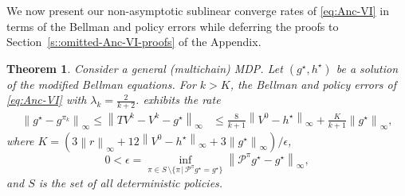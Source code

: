\documentclass{article} %
\newcommand{\cP}{\mathcal{P}}
\newcommand*{\para}[1]{\left({#1}\right)}
\newcommand*{\infn}[1]{\left\|{#1}\right\|_{\infty}}
\newtheorem{theorem}{Theorem}
\begin{document}
We now present our non-asymptotic sublinear converge rates of \ref{eq:Anc-VI} in terms of the Bellman and policy errors while deferring the proofs to Section~\ref{s::omitted-Anc-VI-proofs} of the Appendix. 



\begin{theorem}\label{thm:Anc_optimized}
Consider a general (multichain) MDP.
Let $(g^{\star},h^{\star})$ be a solution of the modified Bellman equations.
For $k>K$, the Bellman and policy errors of \ref{eq:Anc-VI} with $\lambda_{k}=\frac{2}{k+2}$. exhibits the rate
\vspace{-0.05in}
  \begin{align*}
    \infn{g^{\star}-g^{\pi_k}} \le \infn{TV^k-V^k-g^{\star}} &\le  \frac{8}{k+1}\infn{V^0-h^{\star}}+ \frac{K}{k+1} \infn{g^\star},
  \end{align*}
   where $K=\para{3\infn{r}+12\infn{V^0-h^{\star}} +3\infn{g^{\star}}}  /\epsilon$,
  \[0<\epsilon=\inf_{\pi \in S  \, \setminus \{\pi \,|\, \cP^{\pi}g^{\star} =  g^{\star}\}} \infn{\cP^{\pi}g^{\star}-g^{\star}},
  \] and $S$ is the set of all deterministic policies.
\end{theorem}
\end{document}
